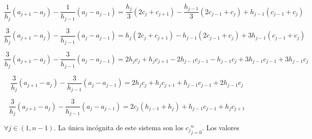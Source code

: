 $$ \frac{1}{h_{j}} (a_{j+1} - a_{j}) - \frac{1}{h_{j-1}} (a_{j} - a_{j-1}) = \frac{h_{j}}{3} (2c_{j} + c_{j+1}) - \frac{h_{j-1}}{3} (2c_{j-1} + c_{j}) + h_{j-1} (c_{j-1} + c_{j})$$

$$ \frac{3}{h_{j}} (a_{j+1} - a_{j}) - \frac{3}{h_{j-1}} (a_{j} - a_{j-1}) = h_{j} (2c_{j} + c_{j+1}) - h_{j-1} (2c_{j-1} + c_{j}) + 3h_{j-1} (c_{j-1} + c_{j}) $$

$$ \frac{3}{h_{j}} (a_{j+1} - a_{j}) - \frac{3}{h_{j-1}} (a_{j} - a_{j-1}) = 2h_{j}c_{j} + h_{j}c_{j+1} - 2h_{j-1}c_{j-1} - h_{j-1}c_{j} + 3h_{j-1}c_{j-1} + 3h_{j-1}c_{j} $$

$$ \frac{3}{h_{j}} (a_{j+1} - a_{j}) - \frac{3}{h_{j-1}} (a_{j} - a_{j-1}) = 2h_{j}c_{j} + h_{j}c_{j+1} + h_{j-1}c_{j-1} + 2h_{j-1}c_{j} $$

\begin{equation}\label{eq:ecuacion3.21}
 \frac{3}{h_{j}} (a_{j+1} - a_{j}) - \frac{3}{h_{j-1}} (a_{j} - a_{j-1}) = 2c_{j}(h_{j-1} + h_{j}) + h_{j-1}c_{j-1} + h_{j}c_{j+1} 
\end{equation}

$\forall j \in (1, n-1)$. La única incógnita de este sistema son los ${c_{j}}_{j=0}^{n}$. Los valores %